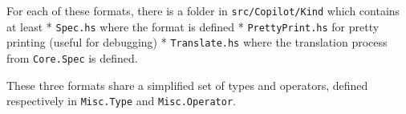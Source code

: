 For each of these formats, there is a folder in
\texttt{src/Copilot/Kind} which contains at least * \texttt{Spec.hs}
where the format is defined * \texttt{PrettyPrint.hs} for pretty
printing (useful for debugging) * \texttt{Translate.hs} where the
translation process from \texttt{Core.Spec} is defined. 

These three formats share a simplified set of types and operators,
defined respectively in \texttt{Misc.Type} and \texttt{Misc.Operator}.




